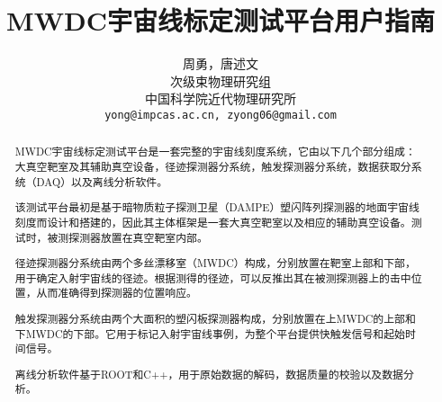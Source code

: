 \documentclass[a4paper,12pt]{ctexrep}
\begin{document}
	\title{\textbf{MWDC宇宙线标定测试平台用户指南}}
	\author{周勇，唐述文\\
	次级束物理研究组\\
	中国科学院近代物理研究所\\
	\texttt{yong@impcas.ac.cn, zyong06@gmail.com}}

	\maketitle

	\begin{abstract}
	MWDC宇宙线标定测试平台是一套完整的宇宙线刻度系统，它由以下几个部分组成：大真空靶室及其辅助真空设备，径迹探测器分系统，触发探测器分系统，数据获取分系统（DAQ）以及离线分析软件。

	该测试平台最初是基于暗物质粒子探测卫星（DAMPE）塑闪阵列探测器的地面宇宙线刻度而设计和搭建的，因此其主体框架是一套大真空靶室以及相应的辅助真空设备。测试时，被测探测器放置在真空靶室内部。

	径迹探测器分系统由两个多丝漂移室（MWDC）构成，分别放置在靶室上部和下部，用于确定入射宇宙线的径迹。根据测得的径迹，可以反推出其在被测探测器上的击中位置，从而准确得到探测器的位置响应。

	触发探测器分系统由两个大面积的塑闪板探测器构成，分别放置在上MWDC的上部和下MWDC的下部。它用于标记入射宇宙线事例，为整个平台提供快触发信号和起始时间信号。

	离线分析软件基于ROOT和C++，用于原始数据的解码，数据质量的校验以及数据分析。
	\end{abstract}

	\tableofcontents
	\listoffigures
	\listoftables

	

	

	

	

	\appendix
	
\end{document}
